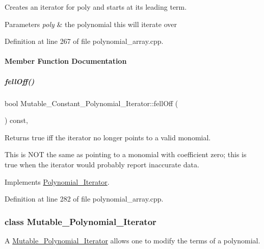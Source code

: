Creates an iterator for {\ttfamily poly} and starts at its leading term. 


\begin{DoxyParams}{Parameters}
{\em poly} & the polynomial {\ttfamily this} will iterate over \\
\hline
\end{DoxyParams}


Definition at line 267 of file polynomial\+\_\+array.\+cpp.



\paragraph{Member Function Documentation}
\mbox{\label{group___iterator_group_a4c7718296e7be3e5c2b942fa71dd69f2}} 
\subparagraph{\texorpdfstring{fell\+Off()}{fellOff()}}
{\footnotesize\ttfamily bool Mutable\+\_\+\+Constant\+\_\+\+Polynomial\+\_\+\+Iterator\+::fell\+Off (\begin{DoxyParamCaption}{ }\end{DoxyParamCaption}) const\hspace{0.3cm}{\ttfamily [override]}, {\ttfamily [virtual]}}

\begin{DoxyReturn}{Returns}
true iff the iterator no longer points to a valid monomial.
\end{DoxyReturn}
This is N\+OT the same as pointing to a monomial with coefficient zero; this is true when the iterator would probably report inaccurate data. 

Implements \hyperlink{group___iterator_group_ac571e120134088d6067718bbad513e2d}{Polynomial\+\_\+\+Iterator}.



Definition at line 282 of file polynomial\+\_\+array.\+cpp.

\label{class_mutable___polynomial___iterator}
\subsubsection{class Mutable\+\_\+\+Polynomial\+\_\+\+Iterator}
A \hyperlink{group___iterator_group_class_mutable___polynomial___iterator}{Mutable\+\_\+\+Polynomial\+\_\+\+Iterator} allows one to modify the terms of a polynomial. 

